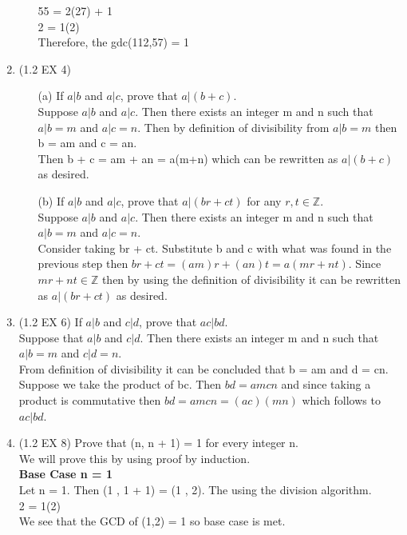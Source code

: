 \documentclass[12pt]{article}
\begin{document}
\begin{enumerate}
\begin{itemize}
        55 = 2(27) + 1 \\
        2 = 1(2) \\
        Therefore, the gdc(112,57) = 1
    \end{itemize}
    \item (1.2 EX 4) 
    \begin{itemize}
        \item[(a)] If $a|b$ and $a|c$, prove that $a|(b+c)$. \\
        Suppose $a|b$ and $a|c$. Then there exists an integer m and n such that $a|b = m$ and $a|c = n$. Then by definition of divisibility from $a|b = m$ then b = am and c = an. \\
        Then b + c = am + an = a(m+n) which can be rewritten as $a|(b+c)$ as desired. 
        \item[(b)] If $a|b$ and $a|c$, prove that $a|(br + ct)$ for any $r,t \in \mathbb{Z}$. \\
        Suppose $a|b$ and $a|c$. Then there exists an integer m and n such that $a|b = m$ and $a|c = n$. \\
        Consider taking br + ct. Substitute b and c with what was found in the previous step then $br + ct = (am)r + (an)t = a(mr+ nt)$. Since $mr + nt \in \mathbb{Z}$ then by using the definition of divisibility it can be rewritten as $a|(br + ct)$ as desired. 
    \end{itemize}
    \item (1.2 EX 6) If $a|b$ and $c|d$, prove that $ac|bd$. \\
    Suppose that $a|b$ and $c|d$. Then there exists an integer m and n such that $a|b = m$ and $c|d = n$. \\
    From definition of divisibility it can be concluded that b = am and d = cn. Suppose we take the product of bc. 
    Then $b d = a m c n $ and since taking a product is commutative then $b d = a m c n = (ac)(mn)$ which follows to $ac |bd$. \\
    \item (1.2 EX 8) Prove that (n, n + 1) = 1 for every integer n. \\
    We will prove this by using proof by induction. \\
    \textbf{Base Case n = 1}  \\
    Let n = 1. Then (1 , 1 + 1) = (1 , 2). The using the division algorithm. \\
    2 = 1(2) \\
    We see that the GCD of (1,2) = 1 so base case is met. \\

\end{enumerate}
\end{document}
